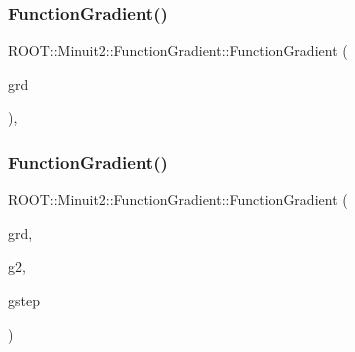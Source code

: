\subsubsection{\texorpdfstring{FunctionGradient()}{FunctionGradient()}\hspace{0.1cm}{\footnotesize\ttfamily [10/12]}}
{\footnotesize\ttfamily R\+O\+O\+T\+::\+Minuit2\+::\+Function\+Gradient\+::\+Function\+Gradient (\begin{DoxyParamCaption}\item[{const \mbox{\hyperlink{namespaceROOT_1_1Minuit2_a62ed97730a1ca8d3fbaec64a19aa11c9}{Mn\+Algebraic\+Vector}} \&}]{grd }\end{DoxyParamCaption})\hspace{0.3cm}{\ttfamily [inline]}, {\ttfamily [explicit]}}

\mbox{\label{classROOT_1_1Minuit2_1_1FunctionGradient_ac9d34f0e3e55ec0e9d5e8a8bd3678b79}} 
\subsubsection{\texorpdfstring{FunctionGradient()}{FunctionGradient()}\hspace{0.1cm}{\footnotesize\ttfamily [11/12]}}
{\footnotesize\ttfamily R\+O\+O\+T\+::\+Minuit2\+::\+Function\+Gradient\+::\+Function\+Gradient (\begin{DoxyParamCaption}\item[{const \mbox{\hyperlink{namespaceROOT_1_1Minuit2_a62ed97730a1ca8d3fbaec64a19aa11c9}{Mn\+Algebraic\+Vector}} \&}]{grd,  }\item[{const \mbox{\hyperlink{namespaceROOT_1_1Minuit2_a62ed97730a1ca8d3fbaec64a19aa11c9}{Mn\+Algebraic\+Vector}} \&}]{g2,  }\item[{const \mbox{\hyperlink{namespaceROOT_1_1Minuit2_a62ed97730a1ca8d3fbaec64a19aa11c9}{Mn\+Algebraic\+Vector}} \&}]{gstep }\end{DoxyParamCaption})\hspace{0.3cm}{\ttfamily [inline]}}

\mbox{\label{classROOT_1_1Minuit2_1_1FunctionGradient_a702df78fcfb1f33625273cb1c9cb1914}} 
